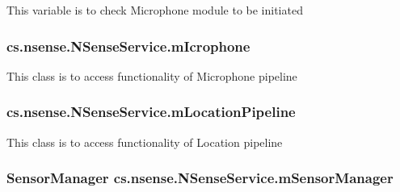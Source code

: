This variable is to check Microphone module to be initiated \hypertarget{classcs_1_1nsense_1_1_n_sense_service_ad27f819aab4981845361ab7accb646e3}{
\subsubsection[{m\-Icrophone}]{ cs.\-nsense.\-N\-Sense\-Service.\-m\-Icrophone\hspace{0.3cm}{\ttfamily [private]}}}\label{classcs_1_1nsense_1_1_n_sense_service_ad27f819aab4981845361ab7accb646e3}
This class is to access functionality of Microphone pipeline \hypertarget{classcs_1_1nsense_1_1_n_sense_service_aa18b9de5a2460c02a578f608c280d1c7}{
\subsubsection[{m\-Location\-Pipeline}]{ cs.\-nsense.\-N\-Sense\-Service.\-m\-Location\-Pipeline\hspace{0.3cm}{\ttfamily [private]}}}\label{classcs_1_1nsense_1_1_n_sense_service_aa18b9de5a2460c02a578f608c280d1c7}
This class is to access functionality of Location pipeline \hypertarget{classcs_1_1nsense_1_1_n_sense_service_a663bbb3131b12621b8cf583266d82ead}{
\subsubsection[{m\-Sensor\-Manager}]{\setlength{\rightskip}{0pt plus 5cm}Sensor\-Manager cs.\-nsense.\-N\-Sense\-Service.\-m\-Sensor\-Manager\hspace{0.3cm}{\ttfamily [private]}}}\label{classcs_1_1nsense_1_1_n_sense_service_a663bbb3131b12621b8cf583266d82ead}
